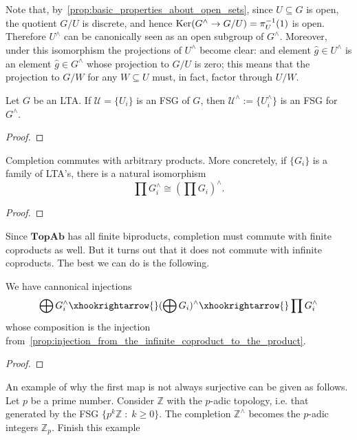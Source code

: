 \begin{remark} Note that, by~\cref{prop:basic_properties_about_open_sets}, since $U \subseteq G$ is open, the quotient $G/U$ is discrete, and hence ${\rm Ker}(G^\land \rightarrow G/U) = \pi_U^{-1}(1)$ is open. Therefore $U^\land$ can be canonically seen as an open subgroup of $G^\land$. Moreover, under this isomorphism the projections of $U^\land$ become clear: and element $\widehat{g} \in U^\land$ is an element $\widehat{g} \in G^\land$ whose projection to $G/U$ is zero; this means that the projection to $G/W$ for any $W \subseteq U$ must, in fact, factor through $U/W$.
\end{remark}

\begin{proposition} Let $G$ be an LTA. If $\mathcal{U} = \{U_i\}$ is an FSG of $G$, then $\mathcal{U}^\land := \{U_i^\land\}$ is an FSG for $G^\land$.
\end{proposition}
\begin{proof} \TODO
\end{proof}

\begin{proposition} Completion commutes with arbitrary products. More concretely, if $\{G_i\}$ is a family of LTA's, there is a natural isomorphism $$\prod G_i^\land \cong ( \prod G_i )^\land.$$
\end{proposition}
\begin{proof} \TODO
\end{proof}

\noindent Since $\textbf{TopAb}$ has all finite biproducts, completion must commute with finite coproducts as well. But it turns out that it does not commute with infinite coproducts. The best we can do is the following.

\begin{proposition} We have cannonical injections
\[\bigoplus G_i^\land \xhookrightarrow{} (\bigoplus G_i)^\land \xhookrightarrow{} \prod G_i^\land\]
whose composition is the injection from~\cref{prop:injection_from_the_infinite_coproduct_to_the_product}.
\end{proposition}
\begin{proof} \TODO
\end{proof}

\begin{remark} An example of why the first map is not always surjective can be given as follows. Let $p$ be a prime number. Consider $\mathbb{Z}$ with the $p$-adic topology, i.e. that generated by the FSG $\{p^k \mathbb{Z} \;:\; k \geq 0\}$. The completion $\mathbb{Z}^\land$ becomes the $p$-adic integers $\mathbb{Z}_p$. \TODO Finish this example
\end{remark}
